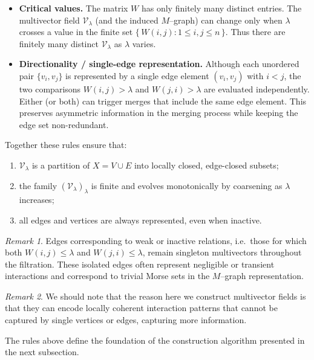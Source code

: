 \documentclass{article}
\theoremstyle{definition}
\theoremstyle{plain}
\theoremstyle{remark}
\newtheorem{remark}{Remark}
\newcommand{\1}{\mathbbm{1}}  %
\begin{document}
\begin{itemize}
    \item \textbf{Critical values.} The matrix \(W\) has only finitely many
    distinct entries.  The multivector field \(\mathcal V_\lambda\) (and the
    induced $M$–graph) can change only when \(\lambda\) crosses a value in
    the finite set \(\{\,W(i,j): 1\le i,j\le n\,\}\).  Thus there are finitely
    many distinct \(\mathcal V_\lambda\) as \(\lambda\) varies.

  \item \textbf{Directionality / single-edge representation.} Although each
    unordered pair \(\{v_i,v_j\}\) is represented by a single edge element
    \((v_i,v_j)\) with \(i<j\), the two comparisons \(W(i,j)>\lambda\) and
    \(W(j,i)>\lambda\) are evaluated independently.  Either (or both) can
    trigger merges that include the same edge element.  This preserves
    asymmetric information in the merging process while keeping the edge set
    non-redundant.
\end{itemize}

\medskip
Together these rules ensure that:
\begin{enumerate}
    \item $\mathcal V_\lambda$ is a partition of $X=V\cup E$ into
          locally closed, edge-closed subsets;
    \item the family $(\mathcal V_\lambda)_\lambda$ is finite and evolves
          monotonically by coarsening as $\lambda$ increases;
    \item all edges and vertices are always represented, even when inactive.
\end{enumerate}

\begin{remark}
\label{rem:edges_singletons-final}
Edges corresponding to weak or inactive relations, i.e.\ those for which
both $W(i,j)\le\lambda$ and $W(j,i)\le\lambda$, remain singleton
multivectors throughout the filtration.  
These isolated edges often represent negligible or transient interactions
and correspond to trivial Morse sets in the $M$--graph representation.
\end{remark}
\begin{remark}
    We should note that the reason here we construct multivector fields is that they can encode locally
coherent interaction patterns that cannot be captured by single vertices or edges, capturing more information.
\end{remark}

The rules above define the foundation of the construction algorithm
presented in the next subsection.
\end{document}
